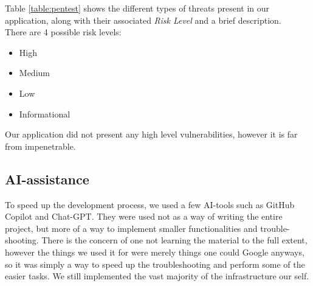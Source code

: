 \vspace{1cm}

Table \ref{table:pentest} shows the different types of threats present in our application, along with their associated \textit{Risk Level} and a brief description.\\
There are 4 possible risk levels:
\vspace{-0.2cm}
\begin{itemize}
    \itemsep -0.5em 
    \item High
    \item Medium
    \item Low
    \item Informational
\end{itemize}


Our application did not present any high level vulnerabilities, however it is far from impenetrable.

\subsection*{AI-assistance}

To speed up the development process, we used a few AI-tools such as GitHub Copilot and Chat-GPT. They were used not as a way of writing the entire project, but more of a way to implement smaller functionalities and trouble-shooting. There is the concern of one not learning the material to the full extent, however the things we used it for were merely things one could Google anyways, so it was simply a way to speed up the troubleshooting and perform some of the easier tasks. We still implemented the vast majority of the infrastructure our self.